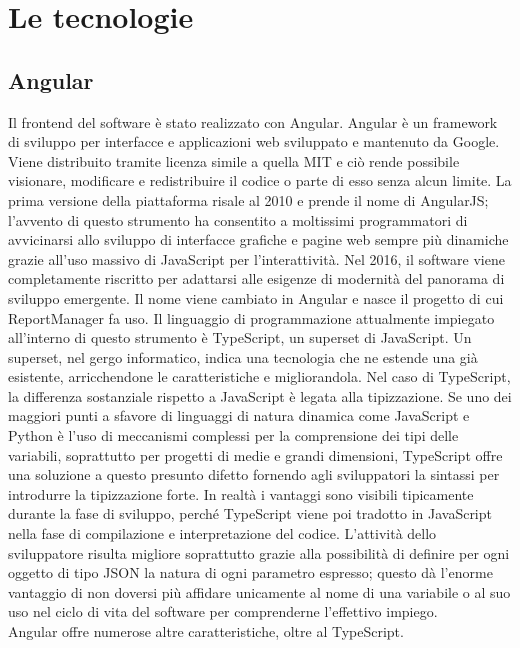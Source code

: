 \chapter{Le tecnologie}\label{c:technologies}

\section{Angular}

Il frontend del software è stato realizzato con Angular.
Angular è un framework di sviluppo per interfacce e applicazioni web sviluppato e mantenuto da Google.
Viene distribuito tramite licenza simile a quella MIT e ciò rende possibile visionare, modificare e redistribuire il codice o parte di esso senza alcun limite.
La prima versione della piattaforma risale al 2010 e prende il nome di AngularJS; l'avvento di questo strumento ha consentito a moltissimi programmatori di avvicinarsi
allo sviluppo di interfacce grafiche e pagine web sempre più dinamiche grazie all'uso massivo di JavaScript per l'interattività.
Nel 2016, il software viene completamente riscritto per adattarsi alle esigenze di modernità del panorama di sviluppo emergente.
Il nome viene cambiato in Angular e nasce il progetto di cui ReportManager fa uso.
Il linguaggio di programmazione attualmente impiegato all'interno di questo strumento è TypeScript, un superset di JavaScript.
Un superset, nel gergo informatico, indica una tecnologia che ne estende una già esistente, arricchendone le caratteristiche e migliorandola.
Nel caso di TypeScript, la differenza sostanziale rispetto a JavaScript è legata alla tipizzazione.
Se uno dei maggiori punti a sfavore di linguaggi di natura dinamica come JavaScript e Python è l'uso di meccanismi complessi per la comprensione dei tipi delle 
variabili, soprattutto per progetti di medie e grandi dimensioni, TypeScript offre una soluzione a questo presunto difetto fornendo agli sviluppatori la sintassi
per introdurre la tipizzazione forte.
In realtà i vantaggi sono visibili tipicamente durante la fase di sviluppo, perché TypeScript viene poi tradotto in JavaScript nella fase di compilazione e interpretazione del codice.
L'attività dello sviluppatore risulta migliore soprattutto grazie alla possibilità di definire per ogni oggetto di tipo JSON la natura di ogni parametro espresso; questo 
dà l'enorme vantaggio di non doversi più affidare unicamente al nome di una variabile o al suo uso nel ciclo di vita del software per comprenderne l'effettivo impiego.
\\
Angular offre numerose altre caratteristiche, oltre al TypeScript.

